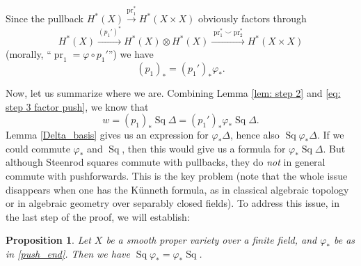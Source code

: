 \documentclass[10pt, reqno]{amsart}
\numberwithin{equation}{subsection}
\DeclareMathOperator{\et}{\acute{e}t}
\DeclareMathOperator{\Sq}{Sq}
\DeclareMathOperator{\pr}{pr}
\newtheorem{prop}[thm]{Proposition}
\theoremstyle{remark}
\newtheorem{remark}[thm]{Remark}
\begin{document}
Since the pullback $H^*_{\et}(X) \xrightarrow{\pr_1^*} H^*_{\et}(X \times X)$ obviously factors through 
\[
H^*_{\et}(X) \xrightarrow{(p_1')^* } H^*_{\et}(X) \otimes H^*_{\et}(X)  \xrightarrow{\pr_1^* \smile  \pr_2^*}  H^*_{\et}(X \times X)
\]
(morally, ``$\pr_1 =   \varphi \circ p_1'$'') we have 
\begin{equation}\label{eq: step 3 factor push}
(p_1)_* = (p_1')_* \varphi_*. 
\end{equation}

Now, let us summarize where we are. Combining Lemma \ref{lem: step 2} and  \eqref{eq: step 3 factor push}, we know that
\begin{equation}\label{eq: step 3 eqn2}
w = (p_1)_* \Sq \Delta = (p_1')_* \varphi_* \Sq \Delta.
\end{equation}
Lemma \ref{Delta_basis} gives us an expression for $\varphi_* \Delta$, hence also $\Sq \varphi_* \Delta$. If we could commute $\varphi_*$ and $\Sq$, then this would give us a formula for $\varphi_* \Sq \Delta$. But although Steenrod squares commute with pullbacks, they do \emph{not} in general commute with pushforwards. This is the key problem (note that the whole issue disappears when one has the K\"{u}nneth formula, as in classical algebraic topology or in algebraic geometry over separably closed fields). To address this issue, in the last step of the proof, we will establish:

\begin{prop}\label{commute}
Let $X$ be a smooth proper variety over a finite field, and $\varphi_*$ be as in \eqref{push_end}. Then we have $\Sq \varphi_* = \varphi_* \Sq$.
\end{prop}

\end{document}
